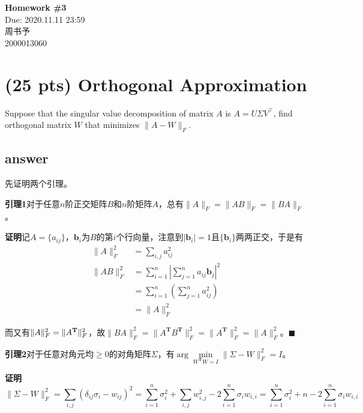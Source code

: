 \documentclass[11pt]{article}
\newcommand{\hwid}{3}			%
\newcommand{\name}{周书予} 		%
\newcommand{\id}{2000013060} 	%
\begin{document}
    \pagestyle{fancy}
    \chead{}

    \begin{center}
        {\LARGE \bf Homework \#\hwid}\\
        {\Large Due: 2020.11.11 23:59}\\
        {\Large \name}\\
        {\Large \id}\\
    \end{center}

  
    
  \section{(25 pts) Orthogonal Approximation}
  Suppose that the singular value decomposition of matrix $A$ is $A = U\Sigma V^\top$, find orthogonal matrix $W$ that minimizes $\|A − W\|_F$.
  \subsection*{answer}
  
  先证明两个引理。
  
  \textbf{引理1}\quad 对于任意$n$阶正交矩阵$B$和$n$阶矩阵$A$，总有$\|A\|_F = \|AB\|_F = \|BA\|_F$。
  
  \textbf{证明}\quad 记$A = \{a_{ij}\}$，$\mathbf b_i$为$B$的第$i$个行向量，注意到$|\mathbf b_i| = 1$且$\{\mathbf b_i\}$两两正交，于是有
  \begin{align*}
  	\|A\|_F^2 &= \sum_{i,j}a_{ij}^2\\
  	\|AB\|_F^2 &= \sum_{i=1}^{n}|\sum_{j=1}^{n}a_{ij}\mathbf{b}_j|^2\\
  	&= \sum_{i=1}^{n}(\sum_{j=1}^{n}a_{ij}^2)\\
   	&= \|A\|_F^2
  \end{align*}
  
  而又有$\|A\|_F^2 = \|A^{\textbf T}\|_F^2$，故$\|BA\|_F^2 = \|A^{\mathbf T}B^{\mathbf T}\|_F^2 = \|A^{\mathbf T}\|_F^2 =\|A\|_F^2$。\hfill $\blacksquare$

	\textbf{引理2}\quad 对于任意对角元均$\ge 0$的对角矩阵$\Sigma$，有$\arg\min\limits_{W^{\mathbf T}W = I}\|\Sigma - W\|_F^2 = I$。
	
	\textbf{证明}\quad
	$$\|\Sigma - W\|_F^2 = \sum_{i,j}(\delta_{ij}\sigma_i - w_{ij})^2 = \sum_{i=1}^{n}\sigma_i^2 + \sum_{i,j}w_{i,j}^2 - 2\sum_{i=1}^n\sigma_iw_{i,i} = \sum_{i=1}^{n}\sigma_i^2 + n - 2\sum_{i=1}^n\sigma_iw_{i,i}$$
	
\end{document}
